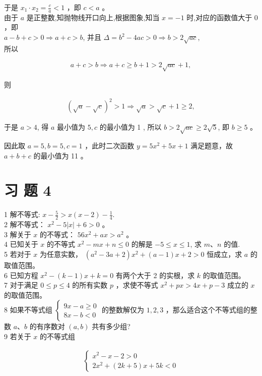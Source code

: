 \documentclass[10pt]{article}
\begin{document}
于是 $x_{1} \cdot x_{2}=\frac{c}{a}<1$ ，即 $c<a$ 。\\
由于 $a$ 是正整数,知抛物线开口向上,根据图象,知当 $x=-1$ 时,对应的函数值大于 0 ，即\\
$a-b+c>0 \Rightarrow a+c>b$, 并且 $\Delta=b^{2}-4 a c>0 \Rightarrow b>2 \sqrt{a c}$,\\
所以

\begin{align*}
a+c>b \Rightarrow a+c \geqslant b+1>2 \sqrt{a c}+1,
\end{align*}

则

\begin{align*}
(\sqrt{a}-\sqrt{c})^{2}>1 \Rightarrow \sqrt{a}>\sqrt{c}+1 \geqslant 2,
\end{align*}

于是 $a>4$, 得 $a$ 最小值为 $5, c$ 的最小值为 1 , 所以 $b>2 \sqrt{a c} \geqslant 2 \sqrt{5}$, 即 $b \geqslant 5$ 。

因此取 $a=5, b=5, c=1$ ，此时二次函数 $y=5 x^{2}+5 x+1$ 满足题意，故 $a+b+c$ 的最小值为 11 。

\section*{习 题 4}
1 解不等式: $x-\frac{5}{2}>x(x-2)-\frac{1}{4}$.\\
2 解不等式： $x^{2}-5|x|+6>0$ 。\\
3 解关于 $x$ 的不等式： $56 x^{2}+a x>a^{2}$ 。\\
4 已知关于 $x$ 的不等式 $x^{2}-m x+n \leqslant 0$ 的解是 $-5 \leqslant x \leqslant 1$, 求 $m 、 n$ 的值.\\
5 若对于 $x$ 为任意实数， $\left(a^{2}-3 a+2\right) x^{2}+(a-1) x+2>0$ 恒成立，求 $a$ 的取值范围。\\
6 已知方程 $x^{2}-(k-1) x+k=0$ 有两个大于 2 的实根，求 $k$ 的取值范围。\\
7 对于满足 $0 \leqslant p \leqslant 4$ 的所有实数 $p$ ，求使不等式 $x^{2}+p x>4 x+p-3$ 成立的 $x$ 的取值范围。\\
8 如果不等式组 $\left\{\begin{array}{l}9 x-a \geqslant 0 \\ 8 x-b<0\end{array}\right.$ 的整数解仅为 $1,2,3$ ，那么适合这个不等式组的整数 $a 、 b$ 的有序数对 $(a, b)$ 共有多少组?\\
9 若关于 $x$ 的不等式组

\begin{align*}
\left\{\begin{array}{l}
x^{2}-x-2>0 \\
2 x^{2}+(2 k+5) x+5 k<0
\end{array}\right.
\end{align*}
\end{document}
